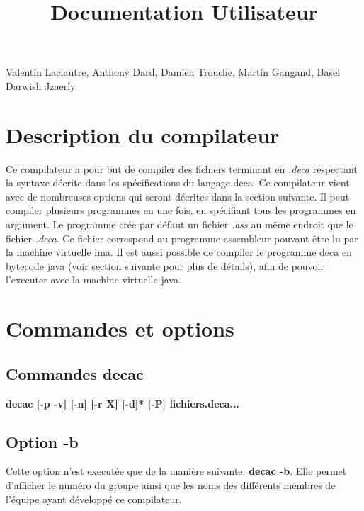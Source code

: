 \documentclass[12pt, a4paper, one side]{article}
\title{Documentation Utilisateur}
\author{}
\date{}
\begin{document}
\maketitle

\begin{center}
    Valentin Laclautre, Anthony Dard, Damien Trouche, Martin Gangand, Basel Darwish Jzaerly
\end{center}

\tableofcontents

\newpage

\section{Description du compilateur}

Ce compilateur a pour but de compiler des fichiers terminant en \textit{.deca}
respectant la syntaxe décrite dans les spécifications du langage deca. Ce compilateur
vient avec de nombreuses options qui seront décrites dans la section suivante. Il
peut compiler plusieurs programmes en une fois, en spécifiant tous les programmes
en argument. Le programme crée par défaut un fichier \textit{.ass} au même endroit que
le fichier \textit{.deca}. Ce fichier correspond au programme assembleur pouvant être lu
par la machine virtuelle ima. Il est aussi possible de compiler le programme deca en
bytecode java (voir section suivante pour plus de détails), afin de pouvoir l'executer
avec la machine virtuelle java.

\section{Commandes et options}

\subsection{Commandes decac}

\textbf{decac [-p \textbar -v] [-n] [-r X] [-d]* [-P] fichiers.deca... \textbar [-b]}

\subsection{Option -b}

Cette option n'est executée que de la manière suivante: \textbf{decac -b}. Elle permet
d'afficher le numéro du groupe ainsi que les noms des différents membres de l'équipe
ayant développé ce compilateur. 
\end{document}
